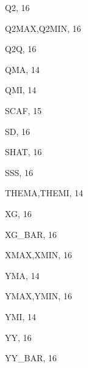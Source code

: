 \documentclass[11pt]{article} \usepackage{mystyle-new}
\begin{document}
\begin{theindex}
  \indexspace

  \item Q2, 16
  \item Q2MAX,Q2MIN, 16
  \item Q2Q, 16
  \item QMA, 14
  \item QMI, 14

  \indexspace

  \item SCAF, 15
  \item SD, 16
  \item SHAT, 16
  \item SSS, 16

  \indexspace

  \item THEMA,THEMI, 14

  \indexspace

  \item XG, 16
  \item XG\_BAR, 16
  \item XMAX,XMIN, 16

  \indexspace

  \item YMA, 14
  \item YMAX,YMIN, 16
  \item YMI, 14
  \item YY, 16
  \item YY\_BAR, 16

\end{theindex}

% 
 
\raggedright 
%

\end{document}
